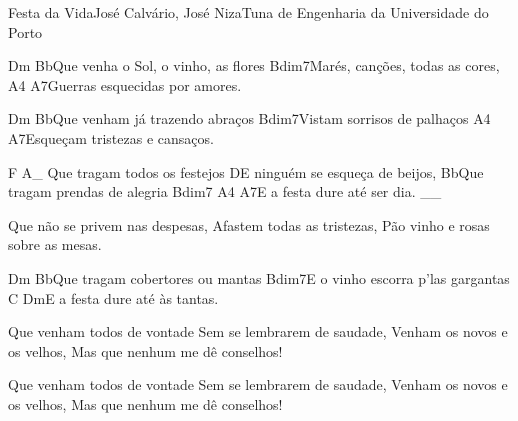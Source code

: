 \begin{musica}{Festa da Vida}{José Calvário, José Niza}{Tuna de Engenharia da Universidade do Porto}

\ac{Dm Bb}{}Que venha o Sol, o vinho, as flores
\ac{Bdim7}{}Marés, canções, todas as cores,
\ac{A4 A7}{}Guerras esquecidas por amores.

\ac{Dm Bb}{}Que venham já trazendo abraços
\ac{Bdim7}{}Vistam sorrisos de palhaços
\ac{A4 A7}{}Esqueçam tristezas e cansaços.

\ac{F A}{}_ Que tragam todos os festejos
\ac{D}{}E ninguém se esqueça de beijos,
\ac{Bb}{}Que tragam prendas de alegria
\ac{Bdim7 A4 A7}{}E a festa dure até ser dia. __

Que não se privem nas despesas,
Afastem todas as tristezas,
Pão vinho e rosas sobre as mesas.

\ac{Dm Bb}{}Que tragam cobertores ou mantas
\ac{Bdim7}{}E o vinho escorra p'las gargantas
\ac{C Dm}{}E a festa dure até às tantas.



Que venham todos de vontade
Sem se lembrarem de saudade,
Venham os novos e os velhos,
Mas que nenhum me dê conselhos!

Que venham todos de vontade
Sem se lembrarem de saudade,
Venham os novos e os velhos,
Mas que nenhum me dê conselhos!


\end{musica}
